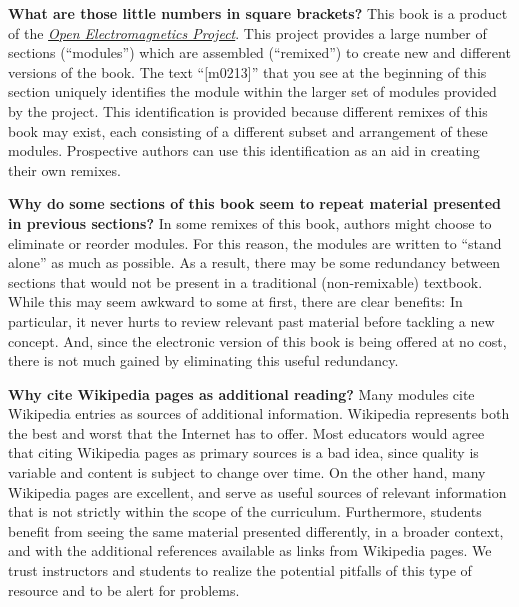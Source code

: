 {\bf What are those little numbers in square brackets?}
This book is a product of the 
\hyperref[m0148_Preface-About_OpenEM]{\emph{Open Electromagnetics Project}}. %
This project provides a large number of sections (``modules'') which are assembled (``remixed'') to create new and different versions of the book.
The text ``{\color{blue}\tiny[m0213]}'' that you see at the beginning of this section uniquely identifies the module within the larger set of modules provided by the project.
This identification is provided because different remixes of this book may exist, each consisting of a different subset and arrangement of these modules. 
Prospective authors can use this identification as an aid in creating their own remixes.

{\bf Why do some sections of this book seem to repeat material presented in previous sections?}
In some remixes of this book, authors might choose to eliminate or reorder modules.  
For this reason, the modules are written to ``stand alone'' as much as possible.
As a result, there may be some redundancy between sections that would not be present in a traditional (non-remixable) textbook.
While this may seem awkward to some at first, there are clear benefits: In particular, it never hurts to review relevant past material before tackling a new concept.
And, since the electronic version of this book is being offered at no cost, there is not much gained by eliminating this useful redundancy.

{\bf Why cite Wikipedia pages as additional reading?}
Many modules cite Wikipedia entries as sources of additional information.
Wikipedia represents both the best and worst that the Internet has to offer.
Most educators would agree that citing Wikipedia pages as primary sources is a bad idea, since quality is variable and
content is subject to change over time.
On the other hand, many Wikipedia pages are excellent, and serve as useful sources of relevant information that is not strictly within the scope of the curriculum.  
Furthermore, students benefit from seeing the same material presented differently, in a broader context, and with the additional references available as links from Wikipedia pages. 
We trust instructors and students to realize the potential pitfalls of this type of resource and to be alert for problems.

